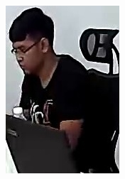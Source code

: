 \begin{figure}[!ht]
    \centering
    \begin{subfigure}[b]{0.2\textwidth}
        \centering
        \includegraphics[width=\textwidth]{chapter4/images/fei_0.jpg}
        \label{fig:ex_5}
    \end{subfigure}
    \begin{subfigure}[b]{0.2\textwidth}
        \centering

\end{subfigure}
\end{figure}
